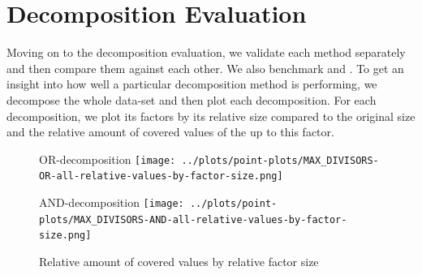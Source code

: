 \section{Decomposition Evaluation}
\label{ch:Evaluation:decomposition-quality}
Moving on to the decomposition evaluation, we validate each method separately and then compare them against each other.
We also benchmark \andDecomp and \orDecomp.
To get an insight into how well a particular decomposition method is performing, we decompose the whole data-set and then plot each decomposition.
For each decomposition, we plot its factors by its relative size compared to the original \DFA size and the relative amount of covered values of the \DFA up to this factor.
\begin{figure}[t]
	\begin{minipage}[h]{0.49\linewidth}
		\centering
		OR-decomposition
		\texttt{[image: ../plots/point-plots/MAX\_DIVISORS-OR-all-relative-values-by-factor-size.png]}
	\end{minipage}
	\begin{minipage}[h]{0.49\linewidth}
		\centering
		AND-decomposition
		\texttt{[image: ../plots/point-plots/MAX\_DIVISORS-AND-all-relative-values-by-factor-size.png]}
	\end{minipage}
	\caption{Relative amount of covered values by relative factor size}
	\label{fig:eval:max-divisor-all-factors}
\end{figure}

